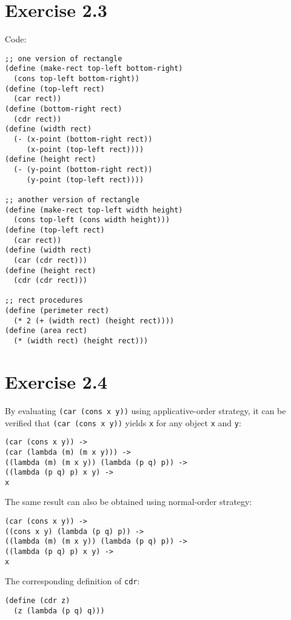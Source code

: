 \documentclass[../main.tex]{subfiles}
\begin{document}
\section{Exercise 2.3}

Code:

\begin{lstlisting}
;; one version of rectangle
(define (make-rect top-left bottom-right)
  (cons top-left bottom-right))
(define (top-left rect)
  (car rect))
(define (bottom-right rect)
  (cdr rect))
(define (width rect)
  (- (x-point (bottom-right rect))
     (x-point (top-left rect))))
(define (height rect)
  (- (y-point (bottom-right rect))
     (y-point (top-left rect))))

;; another version of rectangle
(define (make-rect top-left width height)
  (cons top-left (cons width height)))
(define (top-left rect)
  (car rect))
(define (width rect)
  (car (cdr rect)))
(define (height rect)
  (cdr (cdr rect)))

;; rect procedures
(define (perimeter rect)
  (* 2 (+ (width rect) (height rect))))
(define (area rect)
  (* (width rect) (height rect)))
\end{lstlisting}

\section{Exercise 2.4}

By evaluating \lstinline{(car (cons x y))} using
 applicative-order strategy, it can be verified
 that \lstinline{(car (cons x y))} yields
 \lstinline{x} for any object \lstinline{x} and
 \lstinline{y}:

\begin{lstlisting}
(car (cons x y)) ->
(car (lambda (m) (m x y))) ->
((lambda (m) (m x y)) (lambda (p q) p)) ->
((lambda (p q) p) x y) ->
x
\end{lstlisting}

The same result can also be obtained using
 normal-order strategy:

\begin{lstlisting}
(car (cons x y)) ->
((cons x y) (lambda (p q) p)) ->
((lambda (m) (m x y)) (lambda (p q) p)) ->
((lambda (p q) p) x y) ->
x
\end{lstlisting}

The corresponding definition of \lstinline{cdr}:

\begin{lstlisting}
(define (cdr z)
  (z (lambda (p q) q)))
\end{lstlisting}
\end{document}
